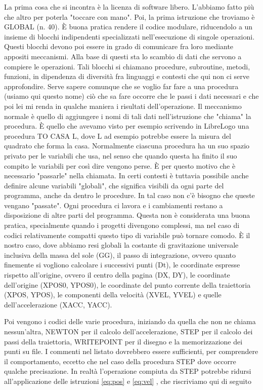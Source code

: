 La prima cosa che si incontra è la licenza di software libero. L'abbiamo fatto più che altro per poterla "toccare con mano". Poi, la prima istruzione che troviamo è GLOBAL (n. 40). È buona pratica rendere il  codice modulare, riducendolo a un insieme di blocchi indipendenti specializzati nell'esecuzione di singole operazioni. Questi blocchi devono poi essere in grado di comunicare fra loro mediante appositi meccanismi. Alla base di questi sta lo scambio di dati che servono a compiere le operazioni. Tali blocchi si chiamano procedure, subroutine, metodi, funzioni, in dipendenza di diversità fra linguaggi e contesti che qui non ci serve approfondire. Serve sapere comunque che se voglio far fare a una procedura (usiamo qui questo nome) ciò che sa fare occorre che le passi i dati necessari e che poi lei mi renda in qualche maniera i risultati dell'operazione. Il meccanismo normale è quello di aggiungere i nomi di tali dati nell'istruzione che "chiama" la procedura. È quello che avevamo visto per esempio scrivendo in LibreLogo una procedura TO CASA L, dove L ad esempio potrebbe essere la misura del quadrato che forma la casa. Normalmente ciascuna procedura ha un suo spazio privato per le variabili che usa, nel senso che quando questa ha finito il suo compito le variabili per così dire vengono perse. È per questo motivo che è necessario "passarle" nella chiamata.  In certi contesti è tuttavia possibile anche definire alcune variabili "globali", che significa visibili da ogni parte del programma, anche da dentro le procedure. In tal caso non c'è bisogno che queste vengano "passate". Ogni procedura ci lavora e i cambiamenti restano a disposizione di altre parti del programma. Questa non è considerata una buona pratica, specialmente quando i progetti divengono complessi, ma nel caso di codici relativamente compatti questo tipo di variabile può tornare comodo. È il nostro caso, dove abbiamo resi globali la costante di gravitazione universale inclusiva della massa del sole (GG), il passo di integrazione, ovvero quanto finemente si vogliono calcolare i successivi punti (Dt), le coordinate espresse rispetto all'origine, ovvero il centro della pagina (DX, DY), le coordinate dell'origine (XPOS0, YPOS0), le coordinate del punto corrente della traiettoria (XPOS, YPOS), le componenti della velocità (XVEL, YVEL) e quelle dell'accelerazione (XACC, YACC). 

Poi vengono i codici delle varie procedura, iniziando da quella che non ne
chiama nessun'altra, NEWTON per il calcolo dell'accelerazione, STEP per il
calcolo dei  passi della traiettoria, WRITEPOINT per il disegno e la
memorizzazione dei punti su file. I commenti nel listato dovrebbero essere
sufficienti, per comprendere il comportamento, eccetto che nel caso della 
procedura STEP dove occorre qualche precisazione. In realtà l'operazione 
compiuta da STEP potrebbe ridursi all'applicazione delle istruzioni 
\ref{eq:pos} e \ref{eq:vel} , che riscriviamo qui di seguito  

